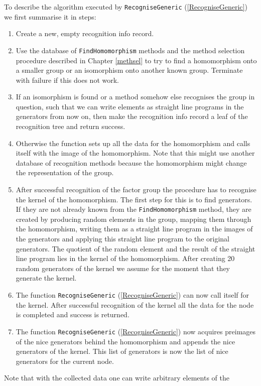 \documentclass[a4paper,11pt]{report}
\begin{document}
{{ To describe the algorithm executed by \texttt{RecogniseGeneric} (\ref{RecogniseGeneric}) we first summarise it in steps: 
\begin{enumerate}
\item Create a new, empty recognition info record.
\item Use the database of \texttt{FindHomomorphism} methods and the method selection procedure described in Chapter \ref{methsel} to try to find a homomorphism onto a smaller group or an isomorphism onto
another known group. Terminate with failure if this does not work.
\item If an isomorphism is found or a method somehow else recognises the group in
question, such that we can write elements as straight line programs in the
generators from now on, then make the recognition info record a leaf of the
recognition tree and return success.
\item Otherwise the function sets up all the data for the homomorphism and calls
itself with the image of the homomorphism. Note that this might use another
database of recognition methods because the homomorphism might change the
representation of the group.
\item After successful recognition of the factor group the procedure has to
recognise the kernel of the homomorphism. The first step for this is to find
generators. If they are not already known from the \texttt{FindHomomorphism} method, they are created by producing random elements in the group, mapping
them through the homomorphism, writing them as a straight line program in the
images of the generators and applying this straight line program to the
original generators. The quotient of the random element and the result of the
straight line program lies in the kernel of the homomorphism. After creating
20 random generators of the kernel we assume for the moment that they generate
the kernel. 
\item The function \texttt{RecogniseGeneric} (\ref{RecogniseGeneric}) can now call itself for the kernel. After successful recognition of the kernel
all the data for the node is completed and success is returned.
\item The function \texttt{RecogniseGeneric} (\ref{RecogniseGeneric}) now acquires preimages of the nice generators behind the homomorphism and
appends the nice generators of the kernel. This list of generators is now the
list of nice generators for the current node.
\end{enumerate}
 Note that with the collected data one can write arbitrary elements of the
}}
\end{document}
